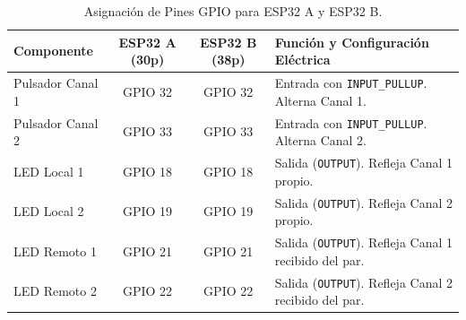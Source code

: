 \documentclass[11pt,a4paper]{article}
\begin{document}
\begin{table}[htbp]
    \centering
    \caption{Asignación de Pines GPIO para ESP32 A y ESP32 B.}
    \label{tab:pinout}
    \begin{tabularx}{\textwidth}{l c c X}
        \toprule
        \textbf{Componente} & \textbf{ESP32 A (30p)} & \textbf{ESP32 B (38p)} & \textbf{Función y Configuración Eléctrica} \\
        \midrule
        Pulsador Canal 1 & GPIO 32 & GPIO 32 & Entrada con \texttt{INPUT\_PULLUP}. Alterna Canal 1. \\
        Pulsador Canal 2 & GPIO 33 & GPIO 33 & Entrada con \texttt{INPUT\_PULLUP}. Alterna Canal 2. \\
        LED Local 1      & GPIO 18 & GPIO 18 & Salida (\texttt{OUTPUT}). Refleja Canal 1 propio. \\
        LED Local 2      & GPIO 19 & GPIO 19 & Salida (\texttt{OUTPUT}). Refleja Canal 2 propio. \\
        LED Remoto 1     & GPIO 21 & GPIO 21 & Salida (\texttt{OUTPUT}). Refleja Canal 1 recibido del par. \\
        LED Remoto 2     & GPIO 22 & GPIO 22 & Salida (\texttt{OUTPUT}). Refleja Canal 2 recibido del par. \\
        \bottomrule
    \end{tabularx}
\end{table}
\end{document}
